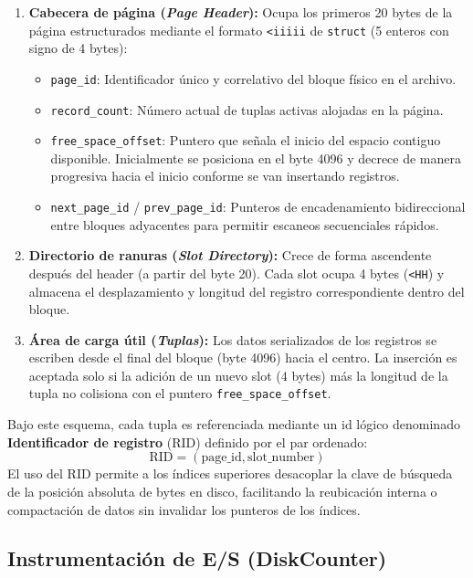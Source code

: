 \documentclass[a4paper,12pt]{article}
\begin{document}
\begin{enumerate}
    \item \textbf{Cabecera de página (\textit{Page Header}):} Ocupa los primeros 20 bytes de la página estructurados mediante el formato \texttt{<iiiii} de \texttt{struct} (5 enteros con signo de 4 bytes):
    \begin{itemize}
        \item \texttt{page\_id}: Identificador único y correlativo del bloque físico en el archivo.
        \item \texttt{record\_count}: Número actual de tuplas activas alojadas en la página.
        \item \texttt{free\_space\_offset}: Puntero que señala el inicio del espacio contiguo disponible. Inicialmente se posiciona en el byte 4096 y decrece de manera progresiva hacia el inicio conforme se van insertando registros.
        \item \texttt{next\_page\_id} / \texttt{prev\_page\_id}: Punteros de encadenamiento bidireccional entre bloques adyacentes para permitir escaneos secuenciales rápidos.
    \end{itemize}
    \item \textbf{Directorio de ranuras (\textit{Slot Directory}):} Crece de forma ascendente después del header (a partir del byte 20). Cada slot ocupa 4 bytes (\texttt{<HH}) y almacena el desplazamiento y longitud del registro correspondiente dentro del bloque.
    \item \textbf{Área de carga útil (\textit{Tuplas}):} Los datos serializados de los registros se escriben desde el final del bloque (byte 4096) hacia el centro. La inserción es aceptada solo si la adición de un nuevo slot ($4$ bytes) más la longitud de la tupla no colisiona con el puntero \texttt{free\_space\_offset}.
\end{enumerate}

Bajo este esquema, cada tupla es referenciada mediante un id lógico denominado \textbf{Identificador de registro} ($\text{RID}$) definido por el par ordenado:
\begin{equation}
    \text{RID} = (\text{page\_id}, \text{slot\_number})
\end{equation}
El uso del $\text{RID}$ permite a los índices superiores desacoplar la clave de búsqueda de la posición absoluta de bytes en disco, facilitando la reubicación interna o compactación de datos sin invalidar los punteros de los índices.

\subsection{Instrumentación de E/S (DiskCounter)}
\end{document}
